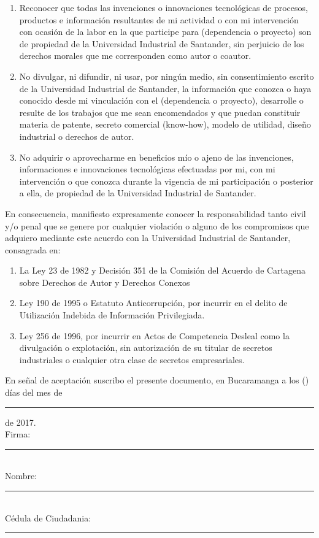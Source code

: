 \documentclass[12pt,letterpaper]{article}
\begin{document}
\begin{enumerate}
\item Reconocer que todas las invenciones o innovaciones tecnológicas de procesos, productos e información resultantes de mi actividad o con mi intervención con ocasión de la labor en la que participe para (dependencia o proyecto)  son de propiedad de la Universidad Industrial de Santander, sin perjuicio de los derechos morales que me corresponden como autor o coautor.

\item No divulgar, ni difundir, ni usar, por ningún medio, sin consentimiento escrito de la Universidad Industrial de Santander, la información que conozca o haya conocido desde mi vinculación con el (dependencia o proyecto), desarrolle o resulte de los trabajos que me sean encomendados y que puedan constituir materia de patente, secreto comercial (know-how), modelo de utilidad, diseño industrial o derechos de autor.

\item No adquirir o aprovecharme en beneficios mío o ajeno de las invenciones, informaciones e innovaciones tecnológicas efectuadas por mi, con mi intervención o que conozca durante la vigencia de mi participación o posterior a ella, de propiedad de la Universidad Industrial de Santander.
\end{enumerate}
En consecuencia, manifiesto expresamente conocer la responsabilidad tanto civil y/o penal que se genere por cualquier violación o alguno de los compromisos que adquiero mediante este acuerdo con la Universidad Industrial de Santander, consagrada en:

\begin{enumerate}
\item La Ley 23 de 1982 y Decisión 351 de la Comisión del Acuerdo de Cartagena sobre Derechos de Autor y Derechos Conexos

\item Ley 190 de 1995 o Estatuto Anticorrupción, por incurrir en el delito de Utilización Indebida de Información Privilegiada.

\item Ley 256 de 1996, por incurrir en Actos de Competencia Desleal como la divulgación o explotación, sin autorización de su titular de secretos industriales o cualquier otra clase de secretos empresariales.
\end{enumerate}
En señal de aceptación suscribo el presente documento, en Bucaramanga a los  (\noindent{\rule{1cm}{0.4pt}}) días del mes de \noindent\rule{2cm}{0.4pt} de 2017.\\
Firma: \rule{5cm}{0.4pt}\\
Nombre: \rule{5cm}{0.4pt}\\
Cédula de Ciudadania: \rule{5cm}{0.4pt}\\
\end{document}
